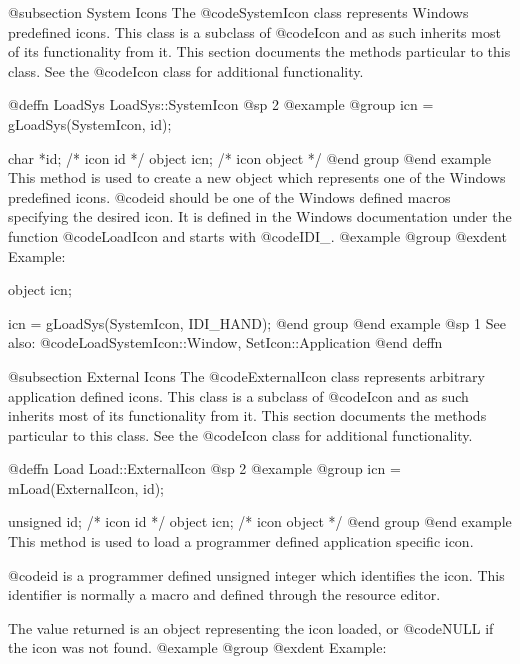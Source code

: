 @subsection System Icons
The @code{SystemIcon} class represents Windows predefined icons.
This class is a subclass of @code{Icon} and as such inherits most
of its functionality from it.  This section documents the methods
particular to this class.  See the @code{Icon} class for additional
functionality.











@deffn {LoadSys} LoadSys::SystemIcon
@sp 2
@example
@group
icn = gLoadSys(SystemIcon, id);

char    *id;    /*  icon id      */
object  icn;    /*  icon object  */
@end group
@end example
This method is used to create a new object which represents one of the
Windows predefined icons.  @code{id} should be one of the Windows
defined macros specifying the desired icon.  It is defined in the
Windows documentation under the function @code{LoadIcon} and
starts with @code{IDI_}.
@example
@group
@exdent Example:

object  icn;

icn = gLoadSys(SystemIcon, IDI_HAND);
@end group
@end example
@sp 1
See also:  @code{LoadSystemIcon::Window, SetIcon::Application}
@end deffn





@subsection External Icons
The @code{ExternalIcon} class represents arbitrary application defined
icons.  This class is a subclass of @code{Icon} and as such inherits
most of its functionality from it.  This section documents the methods
particular to this class.  See the @code{Icon} class for additional
functionality.






@deffn {Load} Load::ExternalIcon
@sp 2
@example
@group
icn = mLoad(ExternalIcon, id);

unsigned id;    /*  icon id      */
object   icn;   /*  icon object  */
@end group
@end example
This method is used to load a programmer defined application specific
icon.

@code{id} is a programmer defined unsigned integer which identifies
the icon.  This identifier is normally a macro and defined through the
resource editor.  

The value returned is an object representing the icon loaded, or
@code{NULL} if the icon was not found.
@example
@group
@exdent Example:

